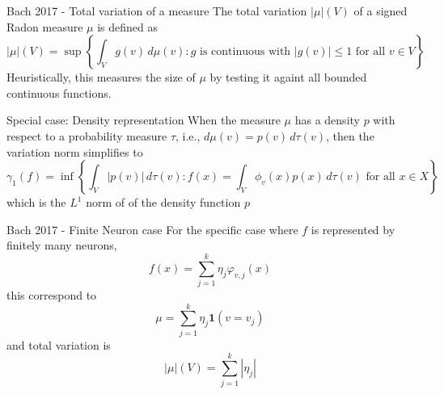 \documentclass[aspectratio=169]{beamer} %
\begin{document}
\begin{frame}{Bach 2017 - Total variation of a measure}
The total variation $|\mu|(V)$ of a signed Radon measure $\mu$ is defined as
$$
|\mu|(V) = \sup\left\{\int_V g(v)\, d\mu(v): g\text{ is continuous with $|g(v)|\le 1$ for all $v\in V$}\right\}
$$
Heuristically, this measures the size of $\mu$ by testing it againt all bounded continuous functions.
\end{frame}
\begin{frame}{Special case: Density representation}
When the measure $\mu$ has a density $p$ with respect to a probability measure $\tau$, i.e., $d\mu(v) = p(v)\, d\tau(v)$, then the variation norm simplifies to
$$
\gamma_1(f) = \inf\left\{\int_V|p(v)|\, d\tau(v): f(x) = \int_V \phi_v(x)p(x)\, d\tau(v)\text{ for all $x\in X$}\right\}
$$
which is the $L^1$ norm of of the density function $p$
 
\end{frame}
\begin{frame}{Bach 2017 - Finite Neuron case}
For the specific case where $f$ is represented by finitely many neurons,
$$
f(x) = \sum_{j=1}^k \eta_j\varphi_{v,j}(x)
$$
this correspond to 
$$
\mu = \sum_{j=1}^k \eta_j \mathbf{1}(v=v_j)
$$
and total variation is
$$
|\mu|(V) = \sum_{j=1}^k|\eta_j|
$$
    
\end{frame}
\end{document}
